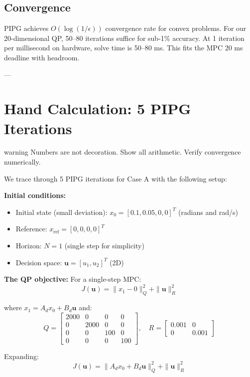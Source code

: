 \subsection{Convergence}

PIPG achieves $O(\log(1/\epsilon))$ convergence rate for convex problems. For our 20-dimensional QP, 50--80 iterations suffice for sub-1\% accuracy. At 1 iteration per millisecond on hardware, solve time is 50--80 ms. This fits the MPC 20 ms deadline with headroom.

---

\section{Hand Calculation: 5 PIPG Iterations}
\begin{block}{warning}
Numbers are not decoration. Show all arithmetic. Verify convergence numerically.
\end{block}

\label{sec:pipg-hand-calc}

We trace through 5 PIPG iterations for Case A with the following setup:

\textbf{Initial conditions:}
\begin{itemize}
\item Initial state (small deviation): $x_0 = [0.1, 0.05, 0, 0]^T$ (radians and rad/s)
\item Reference: $x_{\text{ref}} = [0, 0, 0, 0]^T$
\item Horizon: $N = 1$ (single step for simplicity)
\item Decision space: $\mathbf{u} = [u_1, u_2]^T$ (2D)
\end{itemize}

\textbf{The QP objective:} For a single-step MPC:
\[
J(\mathbf{u}) = \|x_1 - 0\|_Q^2 + \|\mathbf{u}\|_R^2
\]

where $x_1 = A_d x_0 + B_d \mathbf{u}$ and:
\[
Q = \begin{bmatrix} 2000 & 0 & 0 & 0 \\ 0 & 2000 & 0 & 0 \\ 0 & 0 & 100 & 0 \\ 0 & 0 & 0 & 100 \end{bmatrix}, \quad R = \begin{bmatrix} 0.001 & 0 \\ 0 & 0.001 \end{bmatrix}
\]

Expanding:
\[
J(\mathbf{u}) = \|A_d x_0 + B_d \mathbf{u}\|_Q^2 + \|\mathbf{u}\|_R^2
\]


